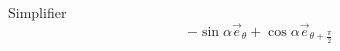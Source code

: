 Simplifier
\begin{displaymath}
 -\sin\alpha \overrightarrow{e}_{\theta} + \cos\alpha \overrightarrow{e}_{\theta+\frac{\pi}{2}}
\end{displaymath}

\bigskip
